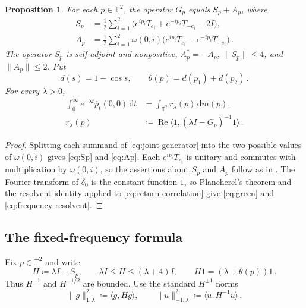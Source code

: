\documentclass[11pt]{amsart}
\theoremstyle{plain}
\newtheorem{proposition}[theorem]{Proposition}
\theoremstyle{definition}
\newcommand{\T}{\mathbb T}
\newcommand{\1}{\mathbf 1}
\newcommand{\ip}[2]{\langle #1,#2\rangle}
\newcommand{\norm}[1]{\lVert #1\rVert}
\newcommand{\dd}{\,\mathrm d}
\newcommand{\Hminus}[1]{\norm{#1}_{-1,\lambda}}
\newcommand{\Hplus}[1]{\norm{#1}_{1,\lambda}}
\begin{document}
\begin{proposition}\label{prop:generator}
For each $p\in\T^2$, the operator $G_p$ equals $S_p+A_p$, where
\begin{align}
  S_p&=\frac12\sum_{i=1}^2
  \bigl(e^{ip_i}T_{e_i}+e^{-ip_i}T_{-e_i}-2I\bigr),\label{eq:Sp}\\
  A_p&=\frac12\sum_{i=1}^2\omega(0,i)
  \bigl(e^{ip_i}T_{e_i}-e^{-ip_i}T_{-e_i}\bigr)\, .\label{eq:Ap}
\end{align}
The operator $S_p$ is self-adjoint and nonpositive, $A_p^*=-A_p$,
$\norm{S_p}\leq4$, and $\norm{A_p}\leq2$.  Put
\[
  d(s)=1-\cos s,\qquad
  \theta(p)=d(p_1)+d(p_2)\, .
\]
For every $\lambda>0$,
\begin{align}
  \int_0^\infty e^{-\lambda t}\overline p_t(0,0)\dd t
      &=\int_{\T^2}r_\lambda(p)\dd m(p),\label{eq:green}\\
  r_\lambda(p)&\coloneqq
      \operatorname{Re}\ip 1{(\lambda I-G_p)^{-1}1}\, .\label{eq:frequency-resolvent}
\end{align}
\end{proposition}

\begin{proof}
Splitting each summand of \eqref{eq:joint-generator} into the two possible
values of $\omega(0,i)$ gives \eqref{eq:Sp} and \eqref{eq:Ap}.  Each
$e^{ip_i}T_{e_i}$ is unitary and commutes with multiplication by
$\omega(0,i)$, so the assertions about $S_p$ and $A_p$ follow as in
\citet*[Section~2]{KT17}.  The Fourier transform of $\delta_0$ is the constant
function $1$, so Plancherel's theorem and the resolvent identity applied to
\eqref{eq:return-correlation} give \eqref{eq:green} and
\eqref{eq:frequency-resolvent}.
\end{proof}

\subsection{The fixed-frequency formula}\label{ssec:varbound}

Fix $p\in\T^2$ and write
\begin{equation}\label{eq:H}
  H\coloneqq\lambda I-S_p,
  \qquad \lambda I\leq H\leq(\lambda+4)I,
  \qquad H1=(\lambda+\theta(p))1\, .
\end{equation}
Thus $H^{-1}$ and $H^{-1/2}$ are bounded.  Use the standard $H^{\pm1}$
norms
\begin{equation}\label{eq:Hnorms}
  \Hplus g^2\coloneqq\ip g{Hg},
  \qquad
  \Hminus u^2\coloneqq\ip u{H^{-1}u}\, .
\end{equation}
\end{document}
